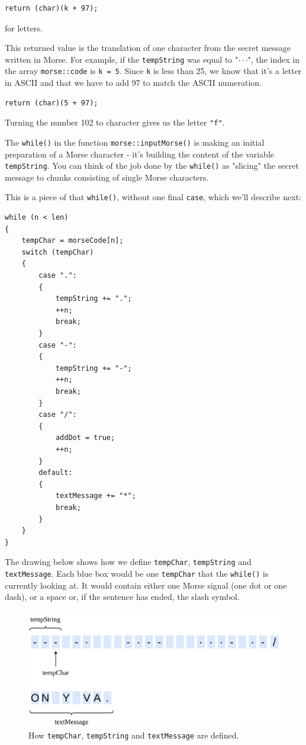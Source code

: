 \documentclass[12pt]{report}
\begin{document}
\begin{lstlisting}
return (char)(k + 97);
\end{lstlisting}

for letters.

This returned value is the translation of one character from the secret message written in Morse. For example, if the \verb|tempString| was equal to "$\cdot\cdot$\text{-}$\cdot$", the index in the array \verb|morse::code| is \verb|k = 5|. Since \verb|k| is less than 25, we know that it's a letter in ASCII and that we have to add 97 to match the ASCII numeration. 

\newpage

\begin{lstlisting}
return (char)(5 + 97);
\end{lstlisting}

Turning the number 102 to character gives us the letter \verb|"f"|.

The \verb|while()| in the function  \verb|morse::inputMorse()| is making an initial preparation of a Morse character - it's building the content of the variable \verb|tempString|. You can think of the job done by the \verb|while()| as "slicing" the secret message to chunks consisting of single Morse characters.

This is a piece of that \verb|while()|, without one final \verb|case|, which we'll describe next:

\begin{lstlisting}
while (n < len)
{
	tempChar = morseCode[n];
	switch (tempChar)
	{
		case ".":
		{
			tempString += ".";
			++n;
			break;
		}
		case "-":
		{
			tempString += "-";
			++n;
			break;
		}
		case "/":
		{
			addDot = true;
			++n;
		}
		default:
		{
			textMessage += "*";
			break;
		}
	}
}
\end{lstlisting}

The drawing below shows how we define \verb|tempChar|, \verb|tempString| and \verb|textMessage|. Each blue box would be one \verb|tempChar| that the \verb|while()| is currently looking at. It would contain either one Morse signal (one dot or one dash), or a space or, if the sentence has ended, the slash symbol.

\begin{figure}[H]
\centering\includegraphics[width=14.5cm]{temp_string}
\caption{How \texttt{tempChar}, \texttt{tempString} and \texttt{textMessage} are defined.}
\label{fig:temp_char}
\end{figure}
\end{document}
